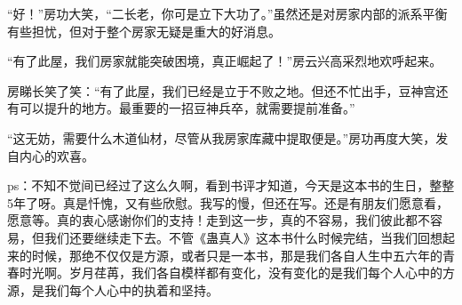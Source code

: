 \begin{this_body}
“好！”房功大笑，“二长老，你可是立下大功了。”虽然还是对房家内部的派系平衡有些担忧，但对于整个房家无疑是重大的好消息。

“有了此屋，我们房家就能突破困境，真正崛起了！”房云兴高采烈地欢呼起来。

房睇长笑了笑：“有了此屋，我们已经是立于不败之地。但还不忙出手，豆神宫还有可以提升的地方。最重要的一招豆神兵卒，就需要提前准备。”

“这无妨，需要什么木道仙材，尽管从我房家库藏中提取便是。”房功再度大笑，发自内心的欢喜。

ps：不知不觉间已经过了这么久啊，看到书评才知道，今天是这本书的生日，整整5年了呀。真是忏愧，又有些欣慰。我写的慢，但还在写。还是有朋友们愿意看，愿意等。真的衷心感谢你们的支持！走到这一步，真的不容易，我们彼此都不容易，但我们还要继续走下去。不管《蛊真人》这本书什么时候完结，当我们回想起来的时候，那绝不仅仅是方源，或者只是一本书，那是我们各自人生中五六年的青春时光啊。岁月荏苒，我们各自模样都有变化，没有变化的是我们每个人心中的方源，是我们每个人心中的执着和坚持。

\end{this_body}

